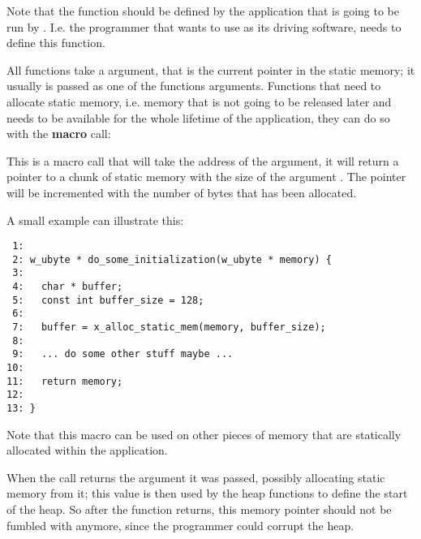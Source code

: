 


Note that the  function should be defined by the
application that is going to be run by \oswald. I.e. the programmer that
wants to use \oswald as its driving software, needs to define this function.

All functions take a  argument, that is the current
pointer in the static memory; it usually is passed as one of the functions
arguments. Functions that need to allocate static memory,
i.e. memory that is not going to be released later and needs to be available
for the whole lifetime of the application, they can do so with the
\textbf{macro} call:


This is a macro call that will take the address of the 
argument, it will return a pointer to a chunk of static memory with the size
of the argument . The  pointer will
be incremented with the number of bytes that has been allocated.

A small example can illustrate this:

\bcode
\begin{verbatim}
 1: 
 2: w_ubyte * do_some_initialization(w_ubyte * memory) {
 3:
 4:   char * buffer;
 5:   const int buffer_size = 128;
 6: 
 7:   buffer = x_alloc_static_mem(memory, buffer_size);
 8:   
 9:   ... do some other stuff maybe ...
10:  
11:   return memory;
12: 
13: }
\end{verbatim}
\ecode

Note that this macro can be used on other pieces of memory that are
statically allocated within the application.

When the call  returns the  argument it was
passed, possibly allocating static memory from it; this value is then used by the
heap functions to define the start of the heap. So after the
 function returns, this memory pointer should not be
fumbled with anymore, since the programmer could corrupt the heap.
